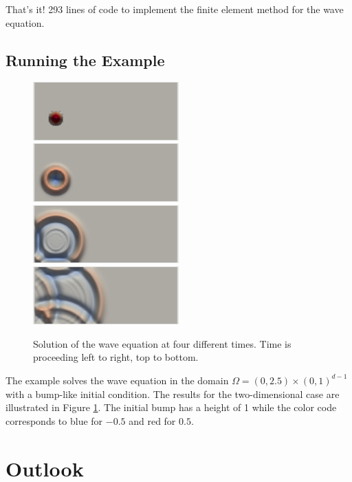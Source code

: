 \documentclass[a4paper,12pt]{article}
\begin{document}
That's it! 293 lines of code to implement the finite element method for
the wave equation.

\subsection{Running the Example}

\begin{figure}
\begin{center}
\includegraphics[width=0.499\textwidth]{wave_0}\hfill
\includegraphics[width=0.499\textwidth]{wave_1}
\includegraphics[width=0.499\textwidth]{wave_2}\hfill
\includegraphics[width=0.499\textwidth]{wave_3}
\end{center}
\caption{Solution of the wave equation at four different times. Time is proceeding left
to right, top to bottom.}
\label{fig:Bunt}
\end{figure}

The example solves the wave equation in the domain 
$\Omega = (0,2.5)\times (0,1)^{d-1}$ with a bump-like
initial condition. The results for the two-dimensional case are
illustrated in Figure \ref{fig:Bunt}. The initial bump has a height of 1
while the color code corresponds to blue for $-0.5$ and red for $0.5$.

\section{Outlook}
\end{document}
